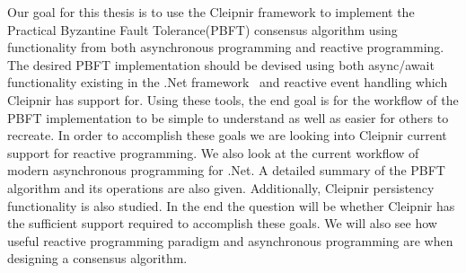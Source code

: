 Our goal for this thesis is to use the Cleipnir framework to implement the Practical Byzantine Fault Tolerance(PBFT) consensus algorithm using functionality from both asynchronous programming and reactive programming. The desired PBFT implementation should be devised using both async/await functionality existing in the .Net framework~\cite{DOC:AsyncAwait} and reactive event handling which Cleipnir has support for. Using these tools, the end goal is for the workflow of the PBFT implementation to be simple to understand as well as easier for others to recreate. In order to accomplish these goals we are looking into Cleipnir current support for reactive programming. We also look at the current workflow of modern asynchronous programming for .Net. A detailed summary of the PBFT algorithm and its operations are also given. Additionally, Cleipnir persistency functionality is also studied.
In the end the question will be whether Cleipnir has the sufficient support required to accomplish these goals. We will also see how useful reactive programming paradigm and asynchronous programming are when designing a consensus algorithm.


